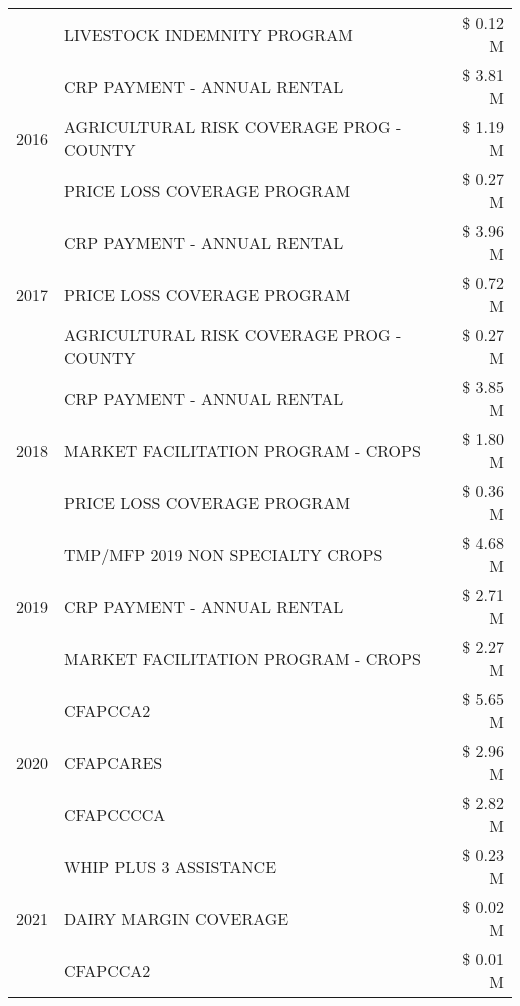\begin{tabular}{llr}
 & LIVESTOCK INDEMNITY PROGRAM & \$ 0.12 M \\
\cline{1-3}
\multirow[t]{3}{*}{2016} & CRP PAYMENT - ANNUAL RENTAL & \$ 3.81 M \\
 & AGRICULTURAL RISK COVERAGE PROG - COUNTY & \$ 1.19 M \\
 & PRICE LOSS COVERAGE PROGRAM & \$ 0.27 M \\
\cline{1-3}
\multirow[t]{3}{*}{2017} & CRP PAYMENT - ANNUAL RENTAL & \$ 3.96 M \\
 & PRICE LOSS COVERAGE PROGRAM & \$ 0.72 M \\
 & AGRICULTURAL RISK COVERAGE PROG - COUNTY & \$ 0.27 M \\
\cline{1-3}
\multirow[t]{3}{*}{2018} & CRP PAYMENT - ANNUAL RENTAL & \$ 3.85 M \\
 & MARKET FACILITATION PROGRAM - CROPS & \$ 1.80 M \\
 & PRICE LOSS COVERAGE PROGRAM & \$ 0.36 M \\
\cline{1-3}
\multirow[t]{3}{*}{2019} & TMP/MFP 2019 NON SPECIALTY CROPS & \$ 4.68 M \\
 & CRP PAYMENT - ANNUAL RENTAL & \$ 2.71 M \\
 & MARKET FACILITATION PROGRAM - CROPS & \$ 2.27 M \\
\cline{1-3}
\multirow[t]{3}{*}{2020} & CFAPCCA2 & \$ 5.65 M \\
 & CFAPCARES & \$ 2.96 M \\
 & CFAPCCCCA & \$ 2.82 M \\
\cline{1-3}
\multirow[t]{3}{*}{2021} & WHIP PLUS 3 ASSISTANCE & \$ 0.23 M \\
 & DAIRY MARGIN COVERAGE & \$ 0.02 M \\
 & CFAPCCA2 & \$ 0.01 M \\
\cline{1-3}
\bottomrule
\end{tabular}
